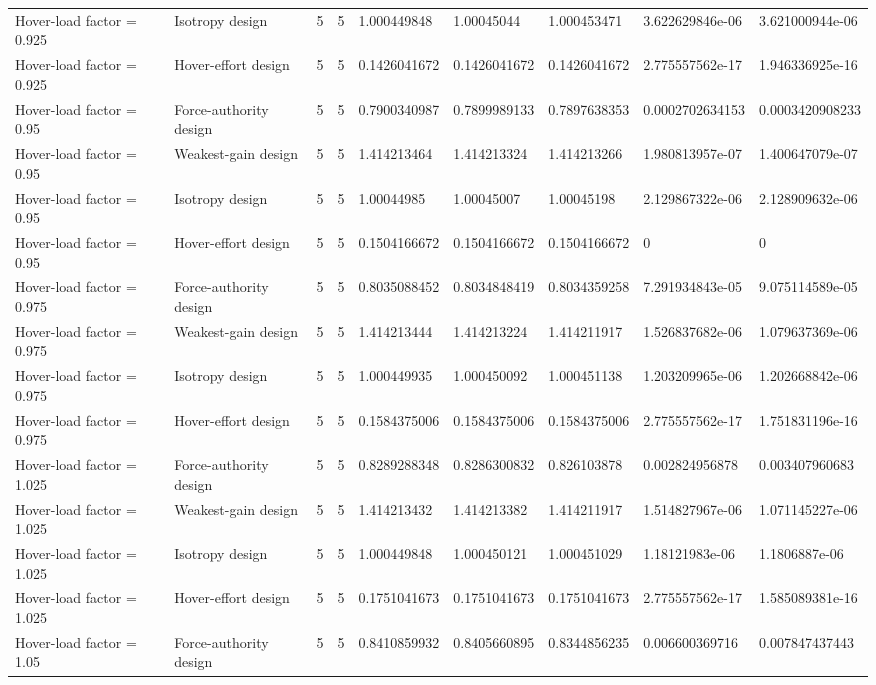 \begin{tabular}{@{}lllllllll@{}}
Hover-load factor = 0.925 & Isotropy design & 5 & 5 & 1.000449848 & 1.00045044 & 1.000453471 & 3.622629846e-06 & 3.621000944e-06 \\
Hover-load factor = 0.925 & Hover-effort design & 5 & 5 & 0.1426041672 & 0.1426041672 & 0.1426041672 & 2.775557562e-17 & 1.946336925e-16 \\
Hover-load factor = 0.95 & Force-authority design & 5 & 5 & 0.7900340987 & 0.7899989133 & 0.7897638353 & 0.0002702634153 & 0.0003420908233 \\
Hover-load factor = 0.95 & Weakest-gain design & 5 & 5 & 1.414213464 & 1.414213324 & 1.414213266 & 1.980813957e-07 & 1.400647079e-07 \\
Hover-load factor = 0.95 & Isotropy design & 5 & 5 & 1.00044985 & 1.00045007 & 1.00045198 & 2.129867322e-06 & 2.128909632e-06 \\
Hover-load factor = 0.95 & Hover-effort design & 5 & 5 & 0.1504166672 & 0.1504166672 & 0.1504166672 & 0 & 0 \\
Hover-load factor = 0.975 & Force-authority design & 5 & 5 & 0.8035088452 & 0.8034848419 & 0.8034359258 & 7.291934843e-05 & 9.075114589e-05 \\
Hover-load factor = 0.975 & Weakest-gain design & 5 & 5 & 1.414213444 & 1.414213224 & 1.414211917 & 1.526837682e-06 & 1.079637369e-06 \\
Hover-load factor = 0.975 & Isotropy design & 5 & 5 & 1.000449935 & 1.000450092 & 1.000451138 & 1.203209965e-06 & 1.202668842e-06 \\
Hover-load factor = 0.975 & Hover-effort design & 5 & 5 & 0.1584375006 & 0.1584375006 & 0.1584375006 & 2.775557562e-17 & 1.751831196e-16 \\
Hover-load factor = 1.025 & Force-authority design & 5 & 5 & 0.8289288348 & 0.8286300832 & 0.826103878 & 0.002824956878 & 0.003407960683 \\
Hover-load factor = 1.025 & Weakest-gain design & 5 & 5 & 1.414213432 & 1.414213382 & 1.414211917 & 1.514827967e-06 & 1.071145227e-06 \\
Hover-load factor = 1.025 & Isotropy design & 5 & 5 & 1.000449848 & 1.000450121 & 1.000451029 & 1.18121983e-06 & 1.1806887e-06 \\
Hover-load factor = 1.025 & Hover-effort design & 5 & 5 & 0.1751041673 & 0.1751041673 & 0.1751041673 & 2.775557562e-17 & 1.585089381e-16 \\
Hover-load factor = 1.05 & Force-authority design & 5 & 5 & 0.8410859932 & 0.8405660895 & 0.8344856235 & 0.006600369716 & 0.007847437443 \\

\end{tabular}
